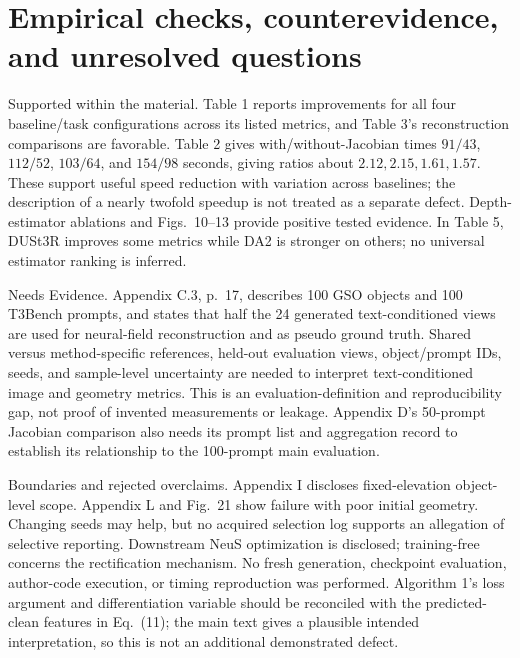 \documentclass[10pt]{article}
\begin{document}
\section*{Empirical checks, counterevidence, and unresolved questions}
Supported within the material. Table 1 reports improvements for all four baseline/task configurations across its listed metrics, and Table 3’s reconstruction comparisons are favorable. Table 2 gives with/without-Jacobian times \(91/43\), \(112/52\), \(103/64\), and \(154/98\) seconds, giving ratios about \(2.12,2.15,1.61,1.57\). These support useful speed reduction with variation across baselines; the description of a nearly twofold speedup is not treated as a separate defect. Depth-estimator ablations and Figs. 10–13 provide positive tested evidence. In Table 5, DUSt3R improves some metrics while DA2 is stronger on others; no universal estimator ranking is inferred.\par
Needs Evidence. Appendix C.3, p. 17, describes 100 GSO objects and 100 T3Bench prompts, and states that half the 24 generated text-conditioned views are used for neural-field reconstruction and as pseudo ground truth. Shared versus method-specific references, held-out evaluation views, object/prompt IDs, seeds, and sample-level uncertainty are needed to interpret text-conditioned image and geometry metrics. This is an evaluation-definition and reproducibility gap, not proof of invented measurements or leakage. Appendix D’s 50-prompt Jacobian comparison also needs its prompt list and aggregation record to establish its relationship to the 100-prompt main evaluation.\par
Boundaries and rejected overclaims. Appendix I discloses fixed-elevation object-level scope. Appendix L and Fig. 21 show failure with poor initial geometry. Changing seeds may help, but no acquired selection log supports an allegation of selective reporting. Downstream NeuS optimization is disclosed; training-free concerns the rectification mechanism. No fresh generation, checkpoint evaluation, author-code execution, or timing reproduction was performed. Algorithm 1’s loss argument and differentiation variable should be reconciled with the predicted-clean features in Eq. (11); the main text gives a plausible intended interpretation, so this is not an additional demonstrated defect.\par
\end{document}
